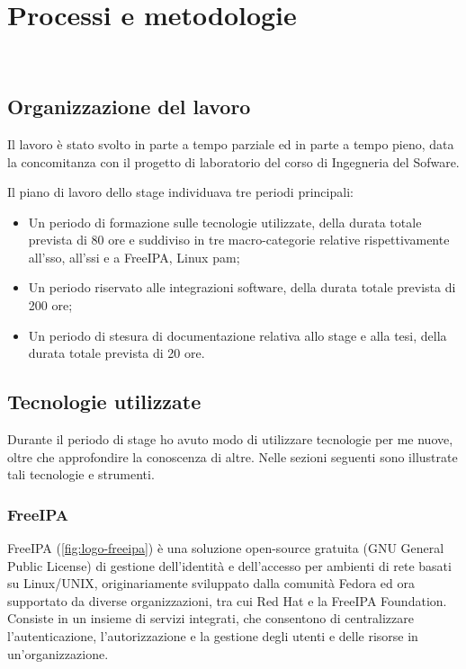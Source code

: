 
\chapter{Processi e metodologie}
\label{cap:processi-metodologie}

\\

\section{Organizzazione del lavoro}

Il lavoro è stato svolto in parte a tempo parziale ed in parte a tempo pieno, data la concomitanza con il progetto di laboratorio del corso di Ingegneria del Sofware. 

Il piano di lavoro dello stage individuava tre periodi principali:

\begin{itemize}
    \item Un periodo di formazione sulle tecnologie utilizzate, della durata totale prevista di 80 ore e suddiviso in tre macro-categorie relative rispettivamente all'\acrshort{sso}, all'\acrshort{ssi} e a FreeIPA, Linux \acrshort{pam};
    \item Un periodo riservato alle integrazioni software, della durata totale prevista di 200 ore;
    \item Un periodo di stesura di documentazione relativa allo stage e alla tesi, della durata totale prevista di 20 ore.
\end{itemize}




\section{Tecnologie utilizzate}

Durante il periodo di stage ho avuto modo di utilizzare tecnologie per me nuove, oltre che approfondire la conoscenza di altre. Nelle sezioni seguenti sono illustrate tali tecnologie e strumenti.

\subsection{FreeIPA}
FreeIPA\cite{site:freeipa-website} (\autoref{fig:logo-freeipa}) è una soluzione open-source gratuita (GNU General Public License) di gestione dell'identità e dell'accesso per ambienti di rete basati su Linux/UNIX, originariamente sviluppato dalla comunità Fedora ed ora supportato da diverse organizzazioni, tra cui Red Hat e la FreeIPA Foundation. Consiste in un insieme di servizi integrati, che consentono di centralizzare l'autenticazione, l'autorizzazione e la gestione degli utenti e delle risorse in un'organizzazione.


